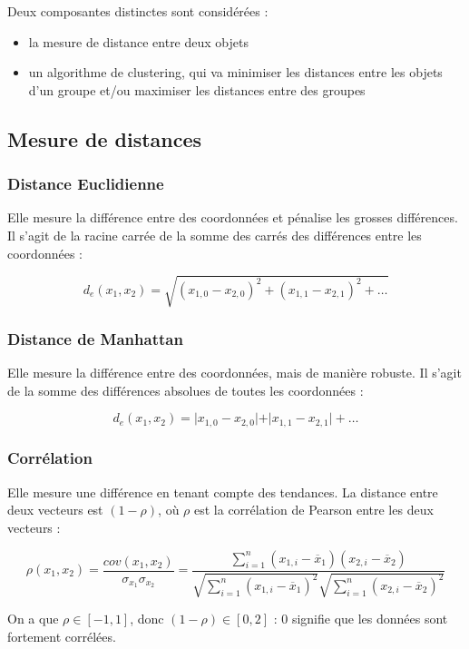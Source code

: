 Deux composantes distinctes sont considérées :

\begin{itemize}
	\item la mesure de distance entre deux objets
	\item un algorithme de clustering, qui va minimiser les distances entre les objets d'un groupe et/ou maximiser les distances entre des groupes
\end{itemize}

	\subsection{Mesure de distances}
		\subsubsection{Distance Euclidienne}
		Elle mesure la différence entre des coordonnées et pénalise les grosses différences. Il s'agit de la racine carrée de la somme des carrés des différences entre les coordonnées :
		
		$$d_e(x_1, x_2) = \sqrt{(x_{1,0}-x_{2,0})^2 + (x_{1,1}-x_{2,1})^2 + \dots}$$
		
		\subsubsection{Distance de Manhattan}
		Elle mesure la différence entre des coordonnées, mais de manière robuste. Il s'agit de la somme des différences absolues de toutes les coordonnées :
		
		$$d_e(x_1, x_2) = \vert x_{1,0}-x_{2,0} \vert + \vert x_{1,1}-x_{2,1} \vert + \dots$$
		
		\subsubsection{Corrélation}
		Elle mesure une différence en tenant compte des tendances. La distance entre deux vecteurs est $(1 - \rho)$, où $\rho$ est la corrélation de Pearson entre les deux vecteurs :
		
		$$\rho(x_1, x_2) = \frac{cov(x_1, x_2)}{\sigma_{x_1} \sigma_{x_2}} = \frac{\sum_{i = 1}^n (x_{1, i} - \overline{x}_1)(x_{2, i} - \overline{x}_2)}{\sqrt{\sum_{i = 1}^n (x_{1, i} - \overline{x}_1)^2} \sqrt{\sum_{i = 1}^n (x_{2, i} - \overline{x}_2)^2}}$$
	
		On a que $\rho \in [-1, 1]$, donc $(1 - \rho) \in [0, 2]$ : 0 signifie que les données sont fortement corrélées.
	
